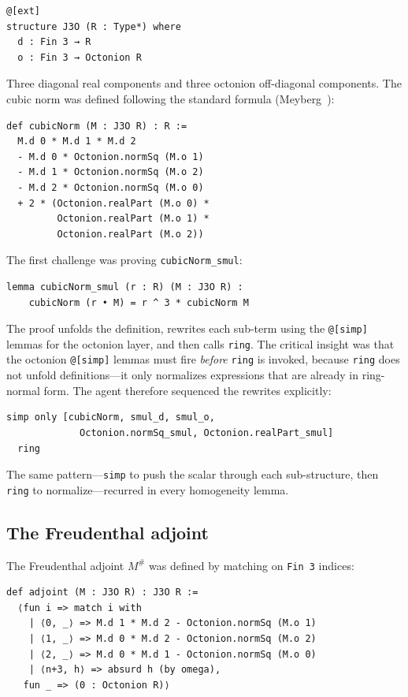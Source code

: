 \documentclass[11pt]{article}
\theoremstyle{definition}
\begin{document}
\begin{lstlisting}[language=leanL]
@[ext]
structure J3O (R : Type*) where
  d : Fin 3 → R
  o : Fin 3 → Octonion R
\end{lstlisting}

Three diagonal real components and three octonion off-diagonal
components. The cubic norm was defined following the standard formula
(Meyberg~\cite{meyberg1970}):

\begin{lstlisting}[language=leanL]
def cubicNorm (M : J3O R) : R :=
  M.d 0 * M.d 1 * M.d 2
  - M.d 0 * Octonion.normSq (M.o 1)
  - M.d 1 * Octonion.normSq (M.o 2)
  - M.d 2 * Octonion.normSq (M.o 0)
  + 2 * (Octonion.realPart (M.o 0) *
         Octonion.realPart (M.o 1) *
         Octonion.realPart (M.o 2))
\end{lstlisting}

The first challenge was proving \texttt{cubicNorm\_smul}:

\begin{lstlisting}[language=leanL]
lemma cubicNorm_smul (r : R) (M : J3O R) :
    cubicNorm (r • M) = r ^ 3 * cubicNorm M
\end{lstlisting}

The proof unfolds the definition, rewrites each sub-term using the
\texttt{@[simp]} lemmas for the octonion layer, and then calls
\texttt{ring}. The critical insight was that the octonion
\texttt{@[simp]} lemmas must fire \emph{before} \texttt{ring} is
invoked, because \texttt{ring} does not unfold definitions---it only
normalizes expressions that are already in ring-normal form. The agent
therefore sequenced the rewrites explicitly:

\begin{lstlisting}[language=leanL]
  simp only [cubicNorm, smul_d, smul_o,
             Octonion.normSq_smul, Octonion.realPart_smul]
  ring
\end{lstlisting}

The same pattern---\texttt{simp} to push the scalar through each
sub-structure, then \texttt{ring} to normalize---recurred in every
homogeneity lemma.

\subsection{The Freudenthal adjoint}
\label{sec:agent-adj}

The Freudenthal adjoint $M^\#$ was defined by matching on \texttt{Fin 3}
indices:

\begin{lstlisting}[language=leanL]
def adjoint (M : J3O R) : J3O R :=
  ⟨fun i => match i with
    | ⟨0, _⟩ => M.d 1 * M.d 2 - Octonion.normSq (M.o 1)
    | ⟨1, _⟩ => M.d 0 * M.d 2 - Octonion.normSq (M.o 2)
    | ⟨2, _⟩ => M.d 0 * M.d 1 - Octonion.normSq (M.o 0)
    | ⟨n+3, h⟩ => absurd h (by omega),
   fun _ => (0 : Octonion R)⟩
\end{lstlisting}
\end{document}
